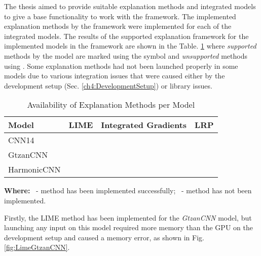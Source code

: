\documentclass[
    bindingoffset=5mm,  %
    footnoteindent=3mm, %
    hyphenation=true    %
]{src/wut-thesis}
\newcommand{\cmark}{\ding{51}} %
\newcommand{\xmark}{\ding{55}} %
\begin{document}
The thesis aimed to provide suitable explanation methods and integrated models to give a base functionality
to work with the framework. The implemented explanation methods by the framework were implemented for
each of the integrated models. The results of the supported explanation framework for the implemented models
in the framework are shown in the Table. \ref{table:AvalibilityTable} where \emph{supported} methods by the model
are marked using the symbol \cmark and \emph{unsupported} methods using \xmark. Some explanation methods had not
been launched properly in some models due to various integration issues that were caused either by the development
setup (Sec. \ref{ch4:DevelopmentSetup}) or library issues.

\begin{table}[h]\centering
    \caption{Availability of Explanation Methods per Model}
    \begin{tabular}{lccc}
    \toprule
    \textbf{Model} & \textbf{LIME} & \textbf{Integrated Gradients} & \textbf{LRP} \\
    \midrule
    CNN14         & \cmark        & \cmark                         & \xmark       \\
    GtzanCNN      & \xmark        & \cmark                         & \cmark       \\
    HarmonicCNN   & \cmark        & \cmark                         & \xmark       \\
    \bottomrule
    \end{tabular}
\label{table:AvalibilityTable}

\hfill

\textbf{Where:} \cmark\ - method has been implemented successfully; \xmark\ - method has not been implemented.
\end{table}

Firstly, the LIME method has been implemented for the \emph{GtzanCNN} model, but launching any
input on this model required more memory than the GPU on the development setup and
caused a memory error, as shown in Fig. \ref{fig:LimeGtzanCNN}.
\end{document}

